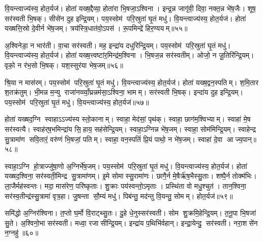 वि॒यन्त्वाज्य॑स्य॒ होत॒र्यज॑। होता॑ यख्ष॒द्दैव्या॒ होता॑रा भि॒षजा॒ऽश्विना। इन्द्र॒न्न जागृ॑वी॒ दिवा॒ नक्त॒न्न भे॑ष॒जैः। शूष॒ सर॑स्वती भि॒षक्। सीसे॑न दुह इन्द्रि॒यम्। पय॒स्सोम॑ परि॒स्रुता॑ घृ॒तं मधु॑। वि॒यन्त्वाज्य॑स्य॒ होत॒र्यज॑। होता॑ यख्षत्ति॒स्रो दे॒वीर्न भे॑ष॒जम्। त्रय॑स्त्रि॒धात॑वो॒ऽपस॑। रू॒पमिन्द्रे॑ हिर॒ण्ययम्॥५५॥

अ॒श्विनेडा॒ न भार॑ती। वा॒चा सर॑स्वती। मह॒ इन्द्रा॑य दधुरिन्द्रि॒यम्। पय॒स्सोम॑ परि॒स्रुता॑ घृ॒तं मधु॑। वि॒यन्त्वाज्य॑स्य॒ होत॒र्यज॑। होता॑ यख्ष॒त्त्वष्टा॑र॒मिन्द्र॑म॒श्विना। भि॒षज॒न्न सर॑स्वतीम्। ओजो॒ न जू॒तिरि॑न्द्रि॒यम्। वृको॒ न र॑भ॒सो भि॒षक्। यश॒स्सुर॑या भेष॒जम्॥५६॥

श्रि॒या न मास॑रम्। पय॒स्सोम॑ परि॒स्रुता॑ घृ॒तं मधु॑। वि॒यन्त्वाज्य॑स्य॒ होत॒र्यज॑। होता॑ यख्ष॒द्वन॒स्पतिम्। श॒मि॒तार श॒तक्र॑तुम्। भी॒मन्न म॒न्यु राजा॑नव्व्याँ॒घ्रन्नम॑सा॒ऽश्विना॒ भामम्। सर॑स्वती भि॒षक्। इन्दा॑य दुह इन्द्रि॒यम्। पय॒स्सोम॑ परि॒स्रुता॑ घृ॒तं मधु॑। वि॒यन्त्वाज्य॑स्य॒ होत॒र्यज॑॥५७॥

होता॑ यख्षद॒ग्नि स्वाहाऽऽज्य॑स्य स्तो॒कानाम्। स्वाहा॒ मेद॑सां॒ पृथ॑क्। स्वाहा॒ छाग॑म॒श्विभ्याम्। स्वाहा॑ मे॒ष सर॑स्वत्यै। स्वाह॑र्‌ष॒भमिन्द्रा॑य सि॒हाय॒ सह॑सेन्द्रि॒यम्। स्वाहा॒ऽग्निन्न भे॑ष॒जम्। स्वाहा॒ सोम॑मिन्द्रि॒यम्। स्वाहेन्द्र सु॒त्रामा॑ण सवि॒तारं॒ वरु॑णं भि॒षजां॒ पतिम्। स्वाहा॒ वन॒स्पतिं॑ प्रि॒यं पाथो॒ न भे॑ष॒जम्। स्वाहा॑ दे॒वा आज्य॒पान्॥५८॥

स्वाहा॒ऽग्नि हो॒त्राज्जु॑षा॒णो अ॒ग्निर्भे॑ष॒जम्। पय॒स्सोम॑ परि॒स्रुता॑ घृ॒तं मधु॑। वि॒यन्त्वाज्य॑स्य॒ होत॒र्यज॑। होता॑ यख्षद॒श्विना॒ सर॑स्वती॒मिन्द्र सु॒त्रामा॑णम्। इ॒मे सोमास्सु॒रामा॑णः। छागै॒र्न मे॒षैर्\mbox{}ऋ॑ष॒भैस्सु॒ताः। शष्पै॒र्न तोक्म॑भिः। ला॒जैर्मह॑स्वन्तः। मदा॒ मास॑रेण॒ परि॑ष्कृताः। शु॒क्राः पय॑स्वन्तो॒ऽमृताः। प्रस्थि॑ता वो मधु॒श्चुत॑। तान॒श्विना॒ सर॑स्व॒तीन्द्र॑स्सु॒त्रामा॑ वृत्र॒हा। जु॒षन्ता सौ॒म्यं मधु॑। पिब॑न्तु॒ मद॑न्तु वि॒यन्तु॒ सोमम्। होत॒र्यज॑॥५९॥\anuvakamend[वी॒र्य॑व्विँ॒यन्त्वाज्य॑स्य॒ होत॒र्यज॒ नास॑त्या॒ सर॑स्वती॒ मधु॑ हिर॒ण्ययं॑ भेष॒जव्विँ॒यन्त्वाज्य॑स्य॒ होत॒र्यजाज्य॒पान॒मृता॒ पञ्च॑ च (स॒मिधा॒ऽग्नि षट्। तनू॒नपाथ्स॒प्त। नरा॒शस॒मृषि॑। इ॒डेडि॒तो यवै॑र॒ष्टौ। ब॒र्‌हि॒स्स॒प्त। दुरो॒ऽश्विना॒ नव॑। सु॒पेश॒सर्‌षि॑। दैव्या॒ होता॑रा॒ सीसे॑न॒ रस॑। ति॒स्रस्त्वष्टा॑रम॒ष्टाव॑ष्टौ। वन॒स्पति॒मृषि॑। अ॒ग्निन्त्रयो॑दश। अ॒श्विना॒ द्वाद॑श त्रयोदश। स॒मिधा॒ऽग्निं बद॑रै॒र्बद॑रै॒र्यवै॑र॒श्विना॒ त्विषि॑म॒श्विना॒ न भे॑ष॒ज रू॒पम॒श्विना॑ भी॒मं भामम् ॥ )]

समि॑द्धो अ॒ग्निर॑श्विना। त॒प्तो घ॒र्मो वि॒राट्थ्सु॒तः। दु॒हे धे॒नुस्सर॑स्वती। सोम शु॒क्रमि॒हेन्द्रि॒यम्। त॒नू॒पा भि॒षजा॑ सु॒ते। अ॒श्विनो॒भा सर॑स्वती। मध्वा॒ रजासीन्द्रि॒यम्। इन्द्रा॑य प॒थिभि॑र्वहान्। इन्द्रा॒येन्दु॒ सर॑स्वती। नरा॒शसे॑न न॒ग्नहु॑॥६०॥

